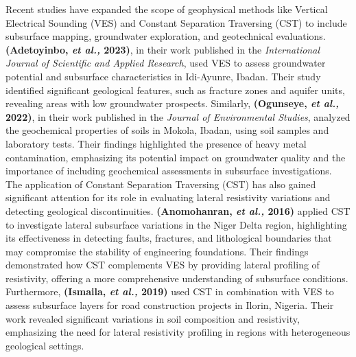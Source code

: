 \documentclass[12pt,a4paper]{report}
\begin{document}
Recent studies have expanded the scope of geophysical methods like Vertical Electrical Sounding (VES) and Constant Separation Traversing (CST) to include subsurface mapping, groundwater exploration, and geotechnical evaluations. \textbf{(Adetoyinbo, \textit{et al.,} 2023)}, in their work published in the \textit{International Journal of Scientific and Applied Research}, used VES to assess groundwater potential and subsurface characteristics in Idi-Ayunre, Ibadan. Their study identified significant geological features, such as fracture zones and aquifer units, revealing areas with low groundwater prospects. Similarly, \textbf{(Ogunseye, \textit{et al.,} 2022)}, in their work published in the \textit{Journal of Environmental Studies}, analyzed the geochemical properties of soils in Mokola, Ibadan, using soil samples and laboratory tests. Their findings highlighted the presence of heavy metal contamination, emphasizing its potential impact on groundwater quality and the importance of including geochemical assessments in subsurface investigations. The application of Constant Separation Traversing (CST) has also gained significant attention for its role in evaluating lateral resistivity variations and detecting geological discontinuities. \textbf{(Anomohanran, \textit{et al.,} 2016)} applied CST to investigate lateral subsurface variations in the Niger Delta region, highlighting its effectiveness in detecting faults, fractures, and lithological boundaries that may compromise the stability of engineering foundations. Their findings demonstrated how CST complements VES by providing lateral profiling of resistivity, offering a more comprehensive understanding of subsurface conditions. Furthermore, \textbf{(Ismaila, \textit{et al.,} 2019)} used CST in combination with VES to assess subsurface layers for road construction projects in Ilorin, Nigeria. Their work revealed significant variations in soil composition and resistivity, emphasizing the need for lateral resistivity profiling in regions with heterogeneous geological settings.
\end{document}
